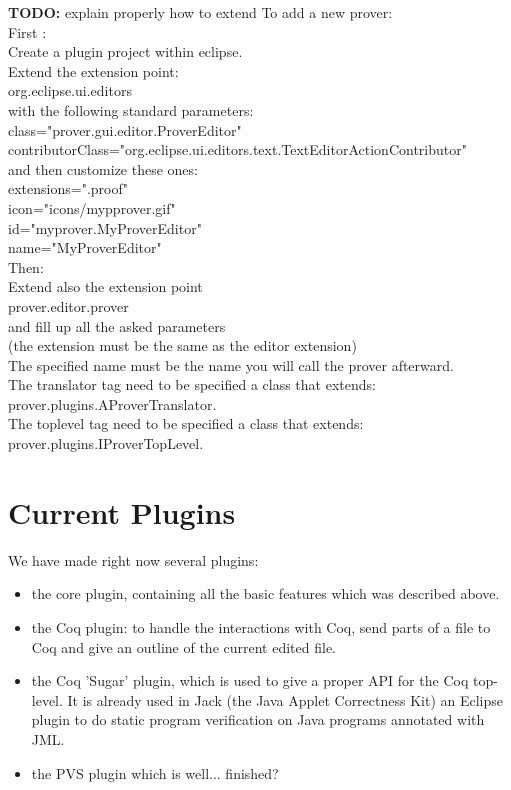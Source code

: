 \documentclass{entcs}
\newcommand{\todo}{\textbf{TODO: }}
\begin{document}
\todo{explain properly how to extend}
To add a new prover:\\

First :\\
Create a plugin project within eclipse.\\
Extend the extension point:\\
org.eclipse.ui.editors\\
with the following standard parameters:\\
class="prover.gui.editor.ProverEditor"\\
contributorClass="org.eclipse.ui.editors.text.TextEditorActionContributor"\\
and then customize these ones:\\
extensions=".proof"\\
icon="icons/mypprover.gif"\\
id="myprover.MyProverEditor"\\
name="MyProverEditor"\\

Then:\\
Extend also the extension point\\
prover.editor.prover\\
and fill up all the asked parameters\\
(the extension must be the same as the editor extension)\\
The specified name must be the name you will call the prover afterward.\\
The translator tag need to be specified a class that extends:\\
prover.plugins.AProverTranslator.\\
The toplevel tag need to be specified a class that extends:\\
prover.plugins.IProverTopLevel.\\




\section{Current Plugins}

We have made right now several plugins:
\begin{itemize}
\item the core plugin, containing all the basic features which was described above.
\item the Coq plugin: to handle the interactions with Coq, send parts of a file to Coq
and give an outline of the current edited file.
\item the Coq 'Sugar' plugin, which is used to give a proper API for the Coq top-level.
It is already used in Jack \cite{Jack-Web} (the Java Applet Correctness Kit) an Eclipse plugin
to do static program verification on Java programs annotated with JML.

\item the PVS plugin which is well... finished?
\end{itemize}
\end{document}
